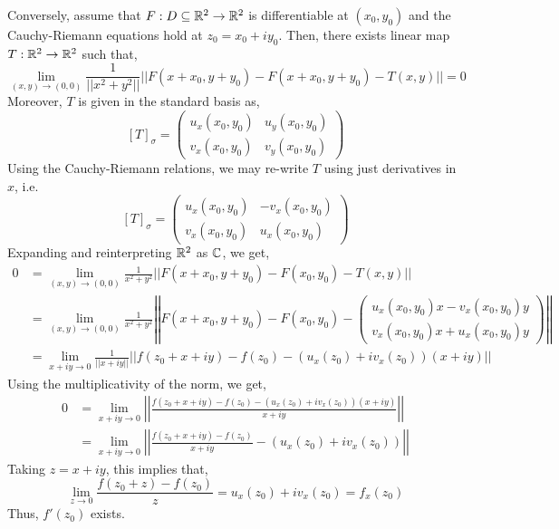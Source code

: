 \documentclass[12pt]{amsart}
\begin{document}
\begin{solution}
    Conversely, assume that $F: D \subseteq \mathbb R^2 \to \mathbb R^2$ is differentiable at $(x_0, y_0)$ and the Cauchy-Riemann equations hold at $z_0 = x_0 + iy_0$. Then, there exists linear map $T: \mathbb R^2 \to \mathbb R^2$ such that,
    \[ \lim_{(x,y) \to (0,0)} \frac{1}{||x^2+y^2||} ||F(x+x_0, y+y_0) - F(x+x_0, y+y_0) - T(x,y)|| = 0 \]
    Moreover, $T$ is given in the standard basis as,
    \[ [T]_\sigma = \begin{pmatrix}
        u_x(x_0, y_0) & u_y(x_0, y_0) \\
        v_x(x_0, y_0) & v_y(x_0, y_0) 
    \end{pmatrix}\]
    Using the Cauchy-Riemann relations, we may re-write $T$ using just derivatives in $x$, i.e. 
    \[ [T]_\sigma = \begin{pmatrix}
        u_x(x_0, y_0) & -v_x(x_0, y_0) \\
        v_x(x_0, y_0) & u_x(x_0, y_0) 
    \end{pmatrix}\]
    Expanding and reinterpreting $\mathbb R^2$ as $\mathbb C$, we get, 
    \begin{align*}
        0 &= \lim_{(x,y) \to (0,0)} \frac{1}{x^2+y^2} ||F(x+x_0, y+y_0) - F(x_0, y_0) - T(x,y)||  \\
        &= \lim_{(x,y) \to (0,0)} \frac{1}{x^2+y^2} \left|\left|F(x+x_0, y+y_0) - F(x_0, y_0) - \begin{pmatrix}
            u_x(x_0, y_0)x-v_x(x_0, y_0)y \\
            v_x(x_0, y_0)x+u_x(x_0, y_0)y
        \end{pmatrix} \right|\right| \\
        &= \lim_{x+iy \to 0} \frac{1}{||x+iy||} || f(z_0+x+iy) - f(z_0) - (u_x(z_0) + iv_x(z_0))(x+iy) || 
    \end{align*}
    Using the multiplicativity of the norm, we get, 
    \begin{align*}
        0 &= \lim_{x+iy \to 0} \left|\left| \frac{f(z_0+x+iy) - f(z_0) - (u_x(z_0) + iv_x(z_0))(x+iy)}{x+iy}\right|\right| \\
        &= \lim_{x+iy \to 0} \left|\left| \frac{f(z_0+x+iy) - f(z_0)}{x+iy} - (u_x(z_0) + iv_x(z_0))\right|\right|
    \end{align*}
    Taking $z = x+iy$, this implies that, 
    \[ \lim_{z \to 0 } \frac{f(z_0+z) - f(z_0)}{z} = u_x(z_0) + iv_x(z_0) = f_x(z_0) \]
    Thus, $f'(z_0)$ exists. 
\end{solution}
\end{document}
